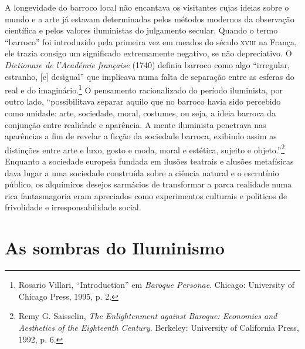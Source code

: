 A longevidade do barroco local não encantava os visitantes cujas ideias
sobre o mundo e a arte já estavam determinadas pelos métodos modernos da
observação científica e pelos valores iluministas do julgamento secular.
Quando o termo ``barroco'' foi introduzido pela primeira vez em meados
do século \textsc{xviii} na França, ele trazia consigo um significado extremamente
negativo, se não depreciativo. O \textit{Dictionare de l'Académie
française} (1740) definia barroco como algo ``irregular, estranho,
{[}e{]} desigual'' que implicava numa falta de separação entre as
esferas do real e do imaginário.\footnote{Rosario Villari, ``Introduction'' em \textit{Baroque Personae}. Chicago: University of Chicago Press, 1995, p. 2.} O pensamento racionalizado do período iluminista, por outro lado, ``possibilitava
separar aquilo que no barroco havia sido percebido como unidade: arte,
sociedade, moral, costumes, ou seja, a ideia barroca da conjunção entre
realidade e aparência. A mente iluminista penetrava nas aparências a fim
de revelar a ficção da sociedade barroca, exibindo assim as distinções
entre arte e luxo, gosto e moda, moral e estética, sujeito e
objeto.''\footnote{Remy G. Saisselin, \textit{The Enlightenment against Baroque: Economics and Aesthetics of the Eighteenth Century}. Berkeley: University of California Press, 1992, p. 6.} Enquanto a sociedade europeia fundada em ilusões teatrais e alusões metafísicas
dava lugar a uma sociedade construída sobre a ciência natural e o
escrutínio público, os alquímicos desejos sarmácios de transformar a
parca realidade numa rica fantasmagoria eram apreciados como
experimentos culturais e políticos de frivolidade e irresponsabilidade
social.

%

\chapter{As sombras do Iluminismo}

\begin{epigraphs} 
\end{epigraphs}

